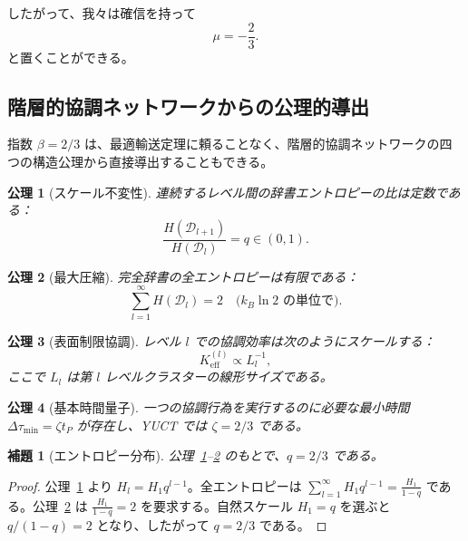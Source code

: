 \documentclass[11pt,a4paper]{article}
\newtheorem{lemma}{補題}[section]
\newtheorem{axiom}{公理}[section]
\begin{document}
	したがって、我々は確信を持って
	\[
	\mu = -\frac{2}{3}. \label{eq:mu}
	\]
	と置くことができる。
	
	\subsection{階層的協調ネットワークからの公理的導出}
	\label{subsec:axiomatic-beta}
	
	指数 \(\beta = 2/3\) は、最適輸送定理に頼ることなく、階層的協調ネットワークの四つの構造公理から直接導出することもできる。
	
	\begin{axiom}[スケール不変性]
		\label{ax:A1}
		連続するレベル間の辞書エントロピーの比は定数である：
		\[
		\frac{H(\mathcal{D}_{l+1})}{H(\mathcal{D}_l)} = q \in (0,1).
		\]
	\end{axiom}
	
	\begin{axiom}[最大圧縮]
		\label{ax:A2}
		完全辞書の全エントロピーは有限である：
		\[
		\sum_{l=1}^{\infty} H(\mathcal{D}_l) = 2 \quad \text{(} k_B\ln 2 \text{ の単位で)}.
		\]
	\end{axiom}
	
	\begin{axiom}[表面制限協調]
		\label{ax:A3}
		レベル \(l\) での協調効率は次のようにスケールする：
		\[
		K_{\mathrm{eff}}^{(l)} \propto L_l^{-1},
		\]
		ここで \(L_l\) は第 \(l\) レベルクラスターの線形サイズである。
	\end{axiom}
	
	\begin{axiom}[基本時間量子]
		\label{ax:A4}
		一つの協調行為を実行するのに必要な最小時間 \(\Delta\tau_{\min} = \zeta t_P\) が存在し、YUCT では \(\zeta = 2/3\) である。
	\end{axiom}
	
	\begin{lemma}[エントロピー分布]
		\label{lem:entropy}
		公理~\ref{ax:A1}--\ref{ax:A2} のもとで、\(q = 2/3\) である。
	\end{lemma}
	\begin{proof}
		公理~\ref{ax:A1} より \(H_l = H_1 q^{l-1}\)。全エントロピーは \(\sum_{l=1}^{\infty} H_1 q^{l-1} = \frac{H_1}{1-q}\) である。公理~\ref{ax:A2} は \(\frac{H_1}{1-q}=2\) を要求する。自然スケール \(H_1 = q\) を選ぶと \(q/(1-q) = 2\) となり、したがって \(q = 2/3\) である。
	\end{proof}
	
\end{document}
